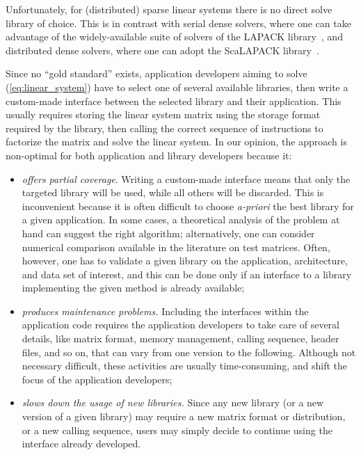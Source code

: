 \documentclass[acmtocl]{acmtrans2m}
\begin{document}
Unfortunately, for (distributed) sparse linear systems there is no direct
solve library of choice. This is in contrast with serial dense solvers, where
one can take advantage of the widely-available suite of solvers of the LAPACK 
library~\cite{lapack-guide}, and distributed dense solvers, where one can
adopt the ScaLAPACK library~\cite{scalapack-guide}.

Since no ``gold standard'' exists, application developers aiming to solve
(\ref{eq:linear_system}) have to select one of several available libraries,
  then write a custom-made interface between the selected library and
  their application. This usually requires storing the linear system matrix using the
  storage format required by the library, then calling the correct sequence of
  instructions to factorize the matrix and solve the linear system.  In our
  opinion, the approach is non-optimal for both application and library
  developers because it:
\begin{itemize}

\item 
{\sl offers partial coverage}. Writing a custom-made interface means that only the
targeted library will be used, while all others will be discarded.
This is inconvenient because 
it is often difficult to choose {\sl a-priori} the best library for a given
application.
In some cases, a theoretical analysis of
the problem at hand can suggest the right algorithm; alternatively, one can
consider numerical comparison available in the literature
on test matrices. Often, however, one has to validate
a given library on the application, architecture, and data
set of interest, and this can be done only if an interface  to a library
implementing the given method is already available;

\item 
{\sl produces maintenance problems.}
Including the interfaces within the application code requires the application
developers to take care of several details, like matrix format, memory
management, calling sequence, header files, and so on, that can vary 
from one version to the following. Although not necessary difficult, these
activities are usually time-consuming, and shift the focus of the application
developers;

\item 
{\sl slows down the usage of new libraries.} Since any new library 
(or a new version of a given library) may require a new matrix format or
distribution, or a new calling sequence, users may simply decide to continue
using the interface already developed.
\end{itemize}
\end{document}
